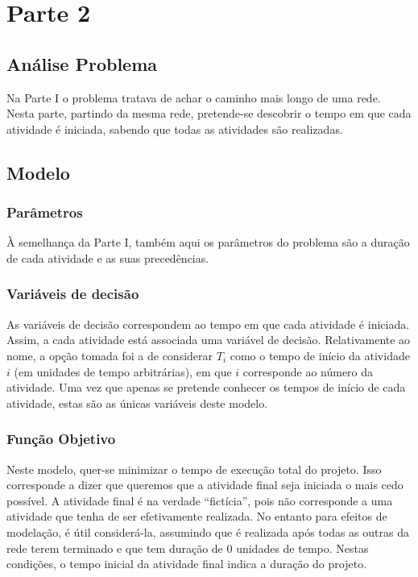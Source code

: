 \chapter{Parte 2}
\label{cap:p2}

\section{Análise Problema}

Na Parte I o problema tratava de achar o caminho mais longo de uma rede. Nesta
parte, partindo da mesma rede, pretende-se descobrir o tempo em que cada
atividade é iniciada, sabendo que todas as atividades são realizadas.

\section{Modelo}

\subsection{Parâmetros}

À semelhança da Parte I, também aqui os parâmetros do problema são a duração de
cada atividade e as suas precedências.

\subsection{Variáveis de decisão}

As variáveis de decisão correspondem ao tempo em que cada atividade é iniciada.
Assim, a cada atividade está associada uma variável de decisão. Relativamente ao
nome, a opção tomada foi a de considerar $T_{i}$ como o tempo de início da
atividade $i$ (em unidades de tempo arbitrárias), em que $i$ corresponde ao número da atividade. Uma vez que apenas se pretende conhecer os tempos de início de cada atividade, estas são as únicas variáveis deste modelo. 

\subsection{Função Objetivo}

Neste modelo, quer-se minimizar o tempo de execução total do projeto. Isso
corresponde a dizer que queremos que a atividade final seja iniciada o mais cedo
possível. A atividade final é na verdade ``fictícia'', pois não corresponde
a uma atividade que tenha de ser efetivamente realizada. No entanto para efeitos
de modelação, é útil considerá-la, assumindo que é realizada após todas as
outras da rede terem terminado e que tem duração de 0 unidades de tempo. Nestas
condições, o tempo inicial da atividade final indica a duração do
projeto.

